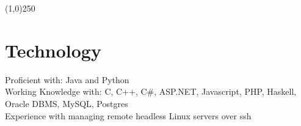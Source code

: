 \documentclass[margin,line, 11pt]{resume}
\begin{document}
\begin{resume}
     



    \vspace{-5mm}
    \line(1,0){250}
    \vspace{-4mm}


   
    \section{\mysidestyle \textbf {Technology} }
    
    Proficient with: Java and Python							\vspace{2mm}\\						
    Working Knowledge with: C, C++, C\#, ASP.NET, Javascript, PHP, Haskell, Oracle DBMS, MySQL, Postgres					\vspace{2mm}\\
    Experience with managing remote headless Linux servers over ssh
    
    \vspace{-5mm}
    
    



    
    


\end{resume}
\end{document}

